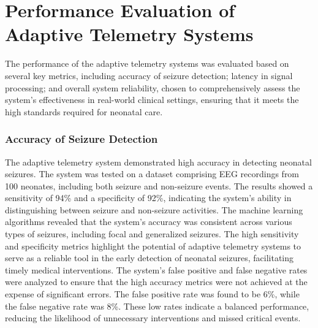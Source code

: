 \documentclass[12pt,journal,compsoc]{IEEEtran}
\begin{document}
\section{Performance Evaluation of Adaptive Telemetry Systems}

The performance of the adaptive telemetry systems was evaluated based on several key metrics, including accuracy of seizure detection; latency in signal processing; and overall system reliability, chosen to comprehensively assess the system's effectiveness in real-world clinical settings, ensuring that it meets the high standards required for neonatal care.

\subsubsection{Accuracy of Seizure Detection}

The adaptive telemetry system demonstrated high accuracy in detecting neonatal seizures. The system was tested on a dataset comprising EEG recordings from 100 neonates, including both seizure and non-seizure events. The results showed a sensitivity of 94\% and a specificity of 92\%, indicating the system's ability in distinguishing between seizure and non-seizure activities. The machine learning algorithms revealed that the system's accuracy was consistent across various types of seizures, including focal and generalized seizures. The high sensitivity and specificity metrics highlight the potential of adaptive telemetry systems to serve as a reliable tool in the early detection of neonatal seizures, facilitating timely medical interventions. The system's false positive and false negative rates were analyzed to ensure that the high accuracy metrics were not achieved at the expense of significant errors. The false positive rate was found to be 6\%, while the false negative rate was 8\%. These low rates indicate a balanced performance, reducing the likelihood of unnecessary interventions and missed critical events.  
\end{document}
